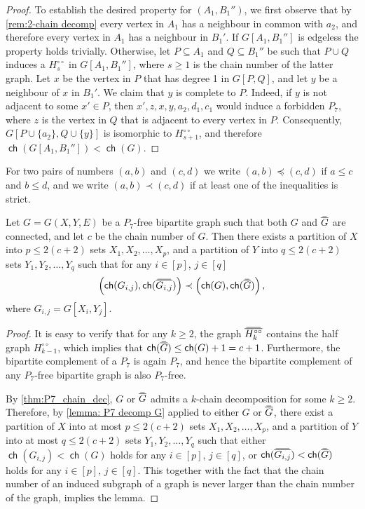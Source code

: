 \documentclass{theoretics}
\newcommand\doverline[1]{%
  \setbox0=\hbox{$\!\overline{#1}\!$}%
  \ht0=\dimexpr\ht0-.2ex\relax%
  \,\overline{\copy0}\,%
}
\newcommand{\bc}[1]{\doverline{#1}} %
\DeclareMathOperator\ch{\mathsf{ch}}
\begin{document}
\begin{proof}
	To establish the desired property for $(A_1, B_1'')$, we first observe that by \cref{rem:2-chain decomp}
	every vertex in $A_1$ has a neighbour in common with $a_2$, and therefore every vertex in $A_1$ has
	a neighbour in $B_1'$. If $G[A_1, B_1'']$ is edgeless the property holds trivially. 
	Otherwise, let $P \subseteq A_1$ and $Q \subseteq B_1''$ be such that $P \cup Q$ induces a 
	$H^{\circ\circ}_s$ in $G[A_1, B_1'']$, where $s \geq 1$ is the chain number of the latter graph.
	Let $x$ be the vertex in $P$ that has degree 1 in $G[P,Q]$, and let $y$ be a neighbour of $x$ in $B_1'$.
	We claim that $y$ is complete to $P$. Indeed, if $y$ is not adjacent to some $x' \in P$, then
	$x', z, x, y, a_2, d_1, c_1$ would induce a forbidden $P_7$, where $z$ is the vertex in $Q$ that is adjacent
	to every vertex in $P$.
	Consequently, $G[P \cup \{ a_2 \}, Q \cup \{ y \}]$ is isomorphic to $H^{\circ\circ}_{s+1}$, and therefore $\ch(G[A_1, B_1'']) < \ch(G)$.
\end{proof}

For two pairs of numbers $(a,b)$ and $(c,d)$ we write $(a,b) \preceq (c,d)$
if $a \leq c$ and $b \leq d$, and we write $(a,b) \prec (c,d)$ if at least one of the
inequalities is strict.
  
\begin{lemma}
	\label{lemma: P7 decomp GcoG}
	Let $G=G(X,Y,E)$ be a $P_7$-free bipartite graph such that both $G$ and $\bc{G}$ are connected, and
	let $c$ be the chain number of $G$. Then there exists 
	a partition of $X$ into $p \leq 2(c+2)$ sets $X_1, X_2, \ldots, X_p$, and
	a partition of $Y$ into $q \leq 2(c+2)$ sets $Y_1, Y_2, \ldots, Y_q$ such that
	for any $i \in[p]$, $j \in [q]$
	$$
		\left( \ch(G_{i,j}), \ch(\bc{G_{i,j}}) \right) \prec  \left( \ch(G), \ch(\bc{G}) \right),
	$$
	where $G_{i,j} = G[X_i, Y_j]$.
\end{lemma}
\begin{proof}
	It is easy to verify that for any $k \geq 2$, the graph $\bc{H^{\circ\circ}_k}$ contains the half graph $H^{\circ\circ}_{k-1}$, which implies that 
	$\ch(\bc{G}) \leq \ch(G) + 1 = c + 1$. Furthermore, the bipartite complement of a $P_7$ is again $P_7$, 
	and hence the bipartite complement of any $P_7$-free bipartite graph is also $P_7$-free.
	
	By \cref{thm:P7_chain_dec}, $G$ or $\bc{G}$ admits a $k$-chain decomposition for some $k \geq 2$.
	Therefore, by \cref{lemma: P7 decomp G} applied to either $G$ or $\bc{G}$, there exist
	a partition of $X$ into at most $p \leq 2(c+2)$ sets $X_1, X_2, \ldots, X_p$, and
	a partition of $Y$ into at most $q \leq 2(c+2)$ sets $Y_1, Y_2, \ldots, Y_q$ such that
	either $\ch(G_{i,j}) <  \ch(G)$ holds for any $i \in[p]$, $j \in [q]$,
	or $\ch(\bc{G_{i,j}}) <  \ch(\bc{G})$ holds for any $i \in[p]$, $j \in [q]$.
	This together with the fact that the chain number of an induced subgraph 
	of a graph is never larger than the chain number of the graph, implies the lemma.
\end{proof}
\end{document}
